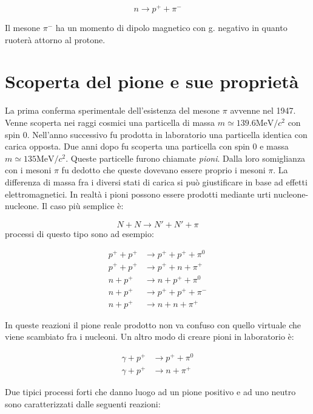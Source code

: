 \begin{equation*}
n \to p^+ + \pi^-
\end{equation*}

Il mesone $\pi^-$ ha un momento di dipolo magnetico con g. negativo in quanto
ruoterà attorno al protone.

\section{Scoperta del pione e sue proprietà}
La prima conferma sperimentale dell'esistenza del mesone $\pi$ avvenne nel 1947.
Venne scoperta nei raggi cosmici una particella di massa $m \simeq 139.6
\text{MeV}/c^2$ con spin $0$. Nell'anno successivo fu prodotta in laboratorio 
una
particella identica con carica opposta. Due anni dopo fu scoperta una particella
con spin $0$ e massa $m \simeq 135 \text{MeV}/c^2$. Queste particelle furono 
chiamate
\textit{pioni}. Dalla loro somiglianza con i mesoni $\pi$ fu dedotto che queste
dovevano essere proprio i mesoni $\pi$. La differenza di massa fra i diversi
stati di carica si può giustificare in base ad effetti elettromagnetici. In
realtà i pioni possono essere prodotti mediante urti nucleone-nucleone. Il caso
più semplice è:

\begin{equation*}
N + N \to N' + N' + \pi
\end{equation*}
processi di questo tipo sono ad esempio:

\begin{align*}
p^+ + p^+ &\to p^+ + p^+ + \pi^0 \\
p^+ + p^+ &\to p^+ + n + \pi^+ \\
n + p^+ &\to n + p^+ + \pi^0 \\
n + p^+ &\to p^+ + p^+ + \pi^- \\
n + p^+ &\to n + n + \pi^+
\end{align*}

In queste reazioni il pione reale prodotto non va confuso con quello virtuale
che viene scambiato fra i nucleoni. Un altro modo di creare pioni in 
laboratorio è:

\begin{align*}
\gamma + p^+ &\to p^+ + \pi^0 \\
\gamma + p^+ &\to n + \pi^+
\end{align*}

Due  tipici processi forti che danno luogo ad un pione
positivo e ad uno neutro sono caratterizzati dalle seguenti reazioni:

